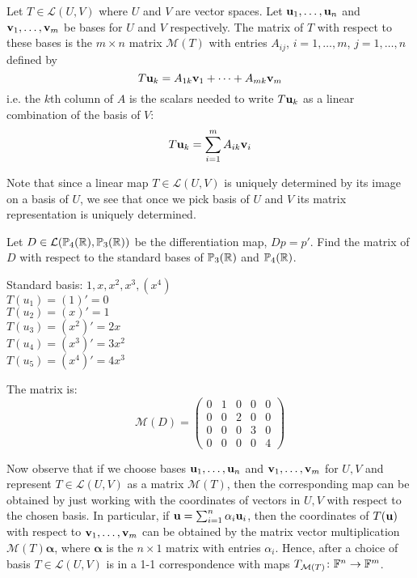 \documentclass{article}
\begin{document}
\begin{definition}\label{def:matrix_rep}
Let $T \in \mathcal{L}(U,V)$ where $U$ and $V$ are vector spaces. Let ${\mathbf{u}}_1, \ldots, {\mathbf{u}}_n$ and ${\mathbf{v}}_1, \ldots, {\mathbf{v}}_m$ be bases for $U$ and $V$ respectively. The matrix of $T$ with respect to these bases is the $m \times n$ matrix $\mathcal{M}(T)$ with entries $A_{ij}$, $i = 1, \ldots, m$, $j = 1, \ldots, n$ defined by
\begin{equation*}
    T{\mathbf{u}}_k = A_{1k} {\mathbf{v}}_1 + \cdots + A_{mk} {\mathbf{v}}_m
\end{equation*}
i.e. the $k$th column of $A$ is the scalars needed to write $T {\mathbf{u}}_k$ as a linear combination of the basis of $V$:
\begin{equation*}
    T {\mathbf{u}}_k = \sum_{i=1}^m A_{ik} {\mathbf{v}}_i 
\end{equation*}
\end{definition}

Note that since a linear map $T\in \mathcal{L}(U,V)$ is uniquely determined by its image on a basis of $U$, we see that once we pick basis of $U$ and $V$ its matrix representation is uniquely determined. 

\begin{example}
Let $D \in \mathcal{L}(\mathbb{P}_4({\mathbb{R}}),\mathbb{P}_3({\mathbb{R}}))$ be the differentiation map, $Dp = p'$. Find the matrix of $D$ with respect to the standard bases of $\mathbb{P}_3({\mathbb{R}})$ and $\mathbb{P}_4({\mathbb{R}})$.

Standard basis: $1, x, x^2, x^3, (x^4)$ \\
$T(u_1) = (1)' = 0$ \\
$T(u_2) = (x)' = 1$ \\ 
$T(u_3) = (x^2)' = 2 x$ \\ 
$T(u_4) = (x^3)' = 3 x^2$ \\
$T(u_5) = (x^4)' = 4 x^3$

The matrix is:
\begin{equation*}
    \mathcal{M}(D) = \begin{pmatrix}
    0 & 1 & 0 & 0 & 0 \\
    0 & 0 & 2 & 0 & 0 \\
    0 & 0 & 0 & 3 & 0 \\
    0 & 0 & 0 & 0 & 4
     \end{pmatrix}
\end{equation*}
\end{example}

Now observe that if we choose bases ${\mathbf{u}}_1, \ldots, {\mathbf{u}}_n$ and ${\mathbf{v}}_1, \ldots, {\mathbf{v}}_m$ for $U,V$ and represent $T\in \mathcal{L}(U,V)$ as a matrix $\mathcal{M}(T)$, then the corresponding map can be obtained by just working with the coordinates of vectors in $U,V$ with respect to the chosen basis. In particular, if ${\mathbf{u}} = \sum_{i=1}^n \alpha_i {\mathbf{u}}_i$, then the coordinates of $T({\mathbf{u}})$ with respect to ${\mathbf{v}}_1, \ldots, {\mathbf{v}}_m$ can be obtained by the matrix vector multiplication $\mathcal{M}(T)\boldsymbol{\alpha}$, where $\boldsymbol{\alpha}$ is the $n\times 1$ matrix with entries $\alpha_i$. Hence, after a choice of basis $T\in \mathcal{L}(U,V)$ is in a 1-1 correspondence with maps $T_{\mathcal{M}(T)} \colon {\mathbb{F}}^n \to {\mathbb{F}}^m$. 
\end{document}
